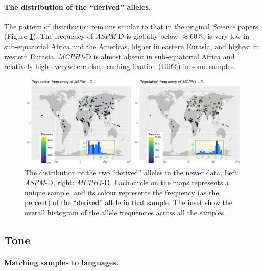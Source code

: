 \documentclass[twoside,twocolumn]{article}
\begin{document}
\paragraph{The distribution of the ``derived'' alleles.}

The pattern of distribution remains similar to that in the original \textit{Science} papers (Figure \ref{Fig:gene_maps}).
The frequency of \textit{ASPM}-D is globally below $\approx 60\%$, is very low in sub-equatorial Africa and the Americas, higher in eastern Eurasia, and highest in western Eurasia.
\textit{MCPH1}-D is almost absent in sub-equatorial Africa and relatively high everywhere else, reaching fixation (100\%) in some samples.

\begin{figure}[h]
  \centering
	\includegraphics[width=\textwidth]{../../code/figures/map_genes}
	\caption{The distribution of the two ``derived'' alleles in the newer data, Left: \textit{ASPM}-D, right: \textit{MCPH1}-D. Each circle on the maps represents a unique sample, and its colour represents the frequency (as the percent) of the ``derived'' allele in that sample. The inset show the overall histogram of the allele frequencies across all the samples.}
	\label{Fig:gene_maps}
\end{figure}


\subsection{Tone}

\paragraph{Matching samples to languages.}
\end{document}
